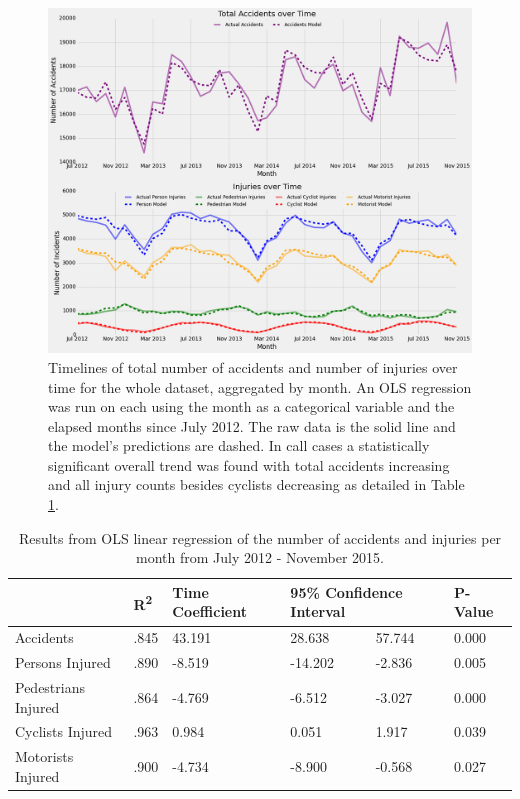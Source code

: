 \documentclass[10pt,journal,compsoc]{IEEEtran}
\begin{document}
\begin{figure}[h]
	\centering
	\includegraphics[width=\textwidth]{fig1.png}
	\caption{Timelines of total number of accidents and number of injuries over time for the whole dataset, aggregated by month.  An OLS regression was run on each using the month as a categorical variable and the elapsed months since July 2012.  The raw data is the solid line and the model's predictions are dashed.  In call cases a statistically significant overall trend was found with total accidents increasing and all injury counts besides cyclists decreasing as detailed in Table \ref{tab:timeline}.}\label{fig:timeline}
\end{figure}

\begin{table}[]
\centering
\caption{Results from OLS linear regression of the number of accidents and injuries per month from July 2012 - November 2015. }
\label{tab:timeline}
\begin{tabular}{|l|l|l|l|l|l|}
\hline
                    & R\textsuperscript{2}   & Time Coefficient & \multicolumn{2}{l|}{95\% Confidence Interval} & P-Value \\ \hline
Accidents           & .845 & 43.191          & 28.638                 & 57.744               & 0.000   \\ \hline
Persons Injured     & .890 & -8.519          & -14.202                & -2.836               & 0.005   \\ \hline
Pedestrians Injured & .864 & -4.769          & -6.512                 & -3.027               & 0.000   \\ \hline
Cyclists Injured    & .963 & 0.984           & 0.051                  & 1.917                & 0.039   \\ \hline
Motorists Injured   & .900 & -4.734          & -8.900                 & -0.568               & 0.027   \\ \hline
\end{tabular}
\end{table}
\end{document}
